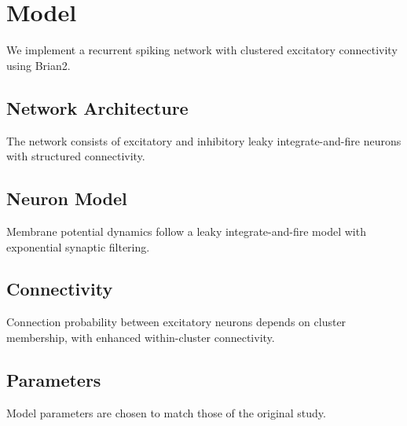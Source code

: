 \section{Model}
\label{sec:model}

We implement a recurrent spiking network with clustered excitatory connectivity using Brian2.

\subsection{Network Architecture}

The network consists of excitatory and inhibitory leaky integrate-and-fire neurons with structured connectivity.

\subsection{Neuron Model}

Membrane potential dynamics follow a leaky integrate-and-fire model with exponential synaptic filtering.

\subsection{Connectivity}

Connection probability between excitatory neurons depends on cluster membership, with enhanced within-cluster connectivity.

\subsection{Parameters}

Model parameters are chosen to match those of the original study.
